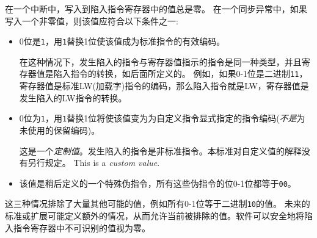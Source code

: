 在一个中断中，写入到陷入指令寄存器中的值总是零。
在一个同步异常中，如果写入一个非零值，则该值应符合以下条件之一:

\begin{itemize}

\item
0位是{\tt 1}，用{\tt 1}替换1位使该值成为标准指令的有效编码。

在这种情况下，发生陷入的指令与寄存器值指示的指令是同一种类型，并且寄存器值是陷入指令的转换，如后面所定义的。
例如，如果0-1位是二进制{\tt 11}，寄存器值是标准LW(加载字)指令的编码，那么陷入指令就是LW，寄存器值是发生陷入的LW指令的转换。

\item
0位为{\tt 1}，用{\tt 1}替换1位将使该值变为为自定义指令显式指定的指令编码(\emph{不是}为未使用的保留编码)。

这是一个\textit{定制值}。发生陷入的指令是非标准指令。本标准对自定义值的解释没有另行规定。
This is a \textit{custom value}.

\item
该值是稍后定义的一个特殊伪指令，所有这些伪指令的位0-1位都等于{\tt 00}。

\end{itemize}

这三种情况排除了大量其他可能的值，例如所有0-1位等于二进制{\tt 10}的值。
未来的标准或扩展可能定义额外的情况，从而允许当前被排除的值。软件可以安全地将陷入指令寄存器中不可识别的值视为零。

